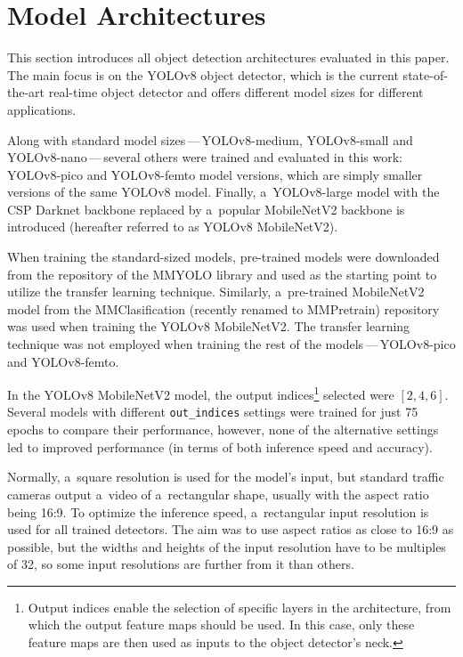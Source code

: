 \section{Model Architectures}


This section introduces all object detection architectures evaluated in this
paper. The main focus is on the YOLOv8 object detector, which is the current
state-of-the-art real-time object detector and offers different model sizes for
different applications.

Along with standard model sizes\,---\,YOLOv8-medium, YOLOv8-small and
YOLOv8-nano\,---\,several others were trained and evaluated in this work:
YOLOv8-pico and YOLOv8-femto model versions, which are simply smaller versions
of the same YOLOv8 model. Finally, a~YOLOv8-large model with the CSP Darknet
backbone replaced by a~popular MobileNetV2 backbone is introduced (hereafter
referred to as YOLOv8 MobileNetV2).

When training the standard-sized models, pre-trained
models were downloaded from the repository of the MMYOLO library and used as the
starting point to utilize the transfer learning technique. Similarly,
a~pre-trained MobileNetV2 model from the MMClasification (recently renamed to
MMPretrain) repository was used when training the YOLOv8 MobileNetV2. The
transfer learning technique was not employed when training the rest of the
models\,---\,YOLOv8-pico and YOLOv8-femto.

In the YOLOv8 MobileNetV2 model, the output indices\footnote{Output indices
enable the selection of specific layers in the architecture, from which the
output feature maps should be used. In this case, only these feature maps are
then used as inputs to the object detector's neck.} selected were $[2, 4, 6]$.
Several models with different \texttt{out\_indices} settings were trained for
just 75 epochs to compare their performance, however, none of the alternative
settings led to improved performance (in terms of both inference speed and
accuracy).

Normally, a~square resolution is used for the model's input, but standard traffic cameras
output a~video of a~rectangular shape, usually with the aspect ratio being 16:9.
To optimize the inference speed, a~rectangular input resolution is used for all
trained detectors. The aim was to use aspect ratios as close to 16:9 as
possible, but the widths and heights of the input resolution have to be multiples of
32, so some input resolutions are further from it than others.

